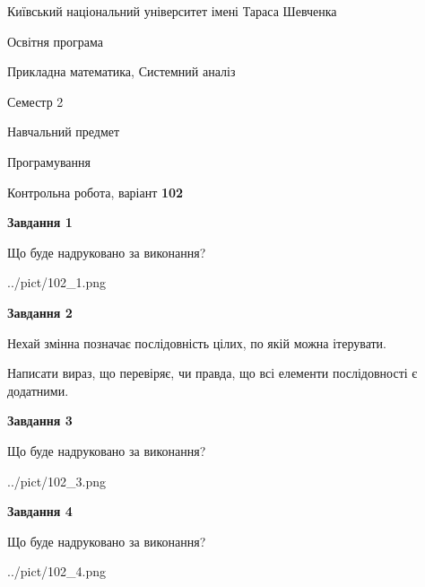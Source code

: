 \documentclass[12pt, ukrainian]{article}
\begin{document}
{{\begin {small}\par
{ \center  Київський національний університет імені Тараса Шевченка \par}
{\parbox {5 cm}{Освітня програма \hfill}{\parbox {8 cm}{Прикладна математика, Системний аналіз \hfill}}\parbox {5 cm}{\hfill Семестр 2}}\par
{\parbox {5 cm} {Навчальний предмет \hfill}\parbox {7 cm}{Програмування \hfill}\parbox {6cm}{\hfill}\par}\vspace{-7pt} \end{small}}{\center Контрольна робота, варіант  \No \textbf
{ 102 }\par}}
{
\begin {large}
{\begin {center}\textbf{Завдання 1}\end {center}}\par
Що буде надруковано за виконання?\par\par
\begin{center}
	{../pict/102_1.png}
\end{center}
\newpage

{\begin {center}\textbf{Завдання 2}\end {center}}\par
Нехай змінна  позначає послідовність цілих, по якій можна ітерувати.

Написати вираз, що перевіряє, чи правда, що всі елементи послідовності є додатни\-ми.\par
\newpage

{\begin {center}\textbf{Завдання 3}\end {center}}\par
Що буде надруковано за виконання?
\begin{center}
	{../pict/102_3.png}
\end{center}
\newpage

{\begin {center}\textbf{Завдання 4}\end {center}}\par
Що буде надруковано за виконання?\par
\begin{center}
	{../pict/102_4.png}
\end{center}
\newpage


\end{large}}
\end{document}
